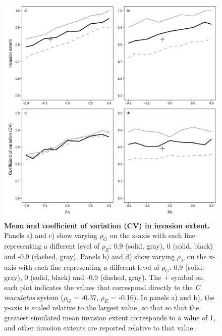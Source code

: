 \begin{figure}[!p]
\centering
\includegraphics[width=0.95\linewidth]{Figures/corr_extent_and_CV.pdf}
\caption[Mean and coefficient of variation (CV) in invasion extent]
{\textbf{Mean and coefficient of variation (CV) in invasion extent.} Panels a) and c) show varying $\rho_{G}$ on the x-axis with each line representing a different level of $\rho_{E}$: 0.9 (solid, gray), 0 (solid, black) and -0.9 (dashed, gray). Panels b) and d) show varying $\rho_{E}$ on the x-axis with each line representing a different level of $\rho_{G}$: 0.9 (solid, gray), 0 (solid, black) and -0.9 (dashed, gray). The $\bm{+}$ symbol on each plot indicates the values that correspond directly to the \textit{C. maculatus} system ($\rho_{G}$ = -0.37, $\rho_{E}$ = -0.16). In panels a) and b), the y-axis is scaled relative to the largest value, so that so that the greatest simulated mean invasion extent corresponds to a value of 1, and other invasion extents are reported relative to that value.} \label{corr:extent} \end{figure}